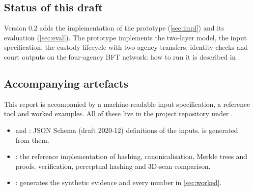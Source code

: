 \subsection{Status of this draft}
Version 0.2 adds the implementation of the prototype (\cref{sec:impl}) and its evaluation (\cref{sec:eval}). The prototype implements the two-layer model, the input specification, the custody lifecycle with two-agency transfers, identity checks and court outputs on the four-agency BFT network; how to run it is described in .

\subsection{Accompanying artefacts}
This report is accompanied by a machine-readable input specification, a reference tool and worked examples. All of these live in the project repository under .
\begin{itemize}
  \item {} and : JSON Schema (draft 2020-12) definitions of the inputs.  is generated from them.
  \item {}: the reference implementation of hashing, canonicalisation, Merkle trees and proofs, verification, perceptual hashing and 3D-scan comparison.
  \item {}: generates the synthetic evidence and every number in \cref{sec:worked}.
\end{itemize}
